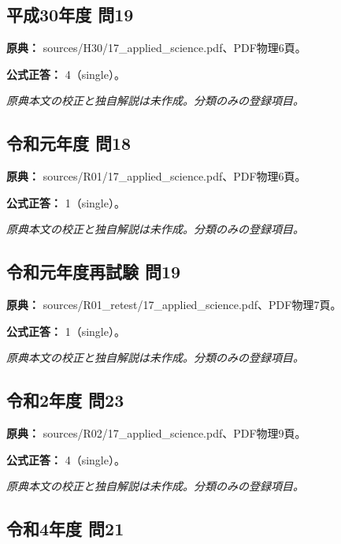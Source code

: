 \subsection{平成30年度 問19}
\label{q:h30-reg-applied-19}

\noindent\textbf{原典：} sources/H30/17\_applied\_science.pdf、PDF物理6頁。

\textbf{公式正答：} 4（single）。

\par\textit{原典本文の校正と独自解説は未作成。分類のみの登録項目。}

\subsection{令和元年度 問18}
\label{q:r01-reg-applied-18}

\noindent\textbf{原典：} sources/R01/17\_applied\_science.pdf、PDF物理6頁。

\textbf{公式正答：} 1（single）。

\par\textit{原典本文の校正と独自解説は未作成。分類のみの登録項目。}

\subsection{令和元年度再試験 問19}
\label{q:r01-ret-applied-19}

\noindent\textbf{原典：} sources/R01\_retest/17\_applied\_science.pdf、PDF物理7頁。

\textbf{公式正答：} 1（single）。

\par\textit{原典本文の校正と独自解説は未作成。分類のみの登録項目。}

\subsection{令和2年度 問23}
\label{q:r02-reg-applied-23}

\noindent\textbf{原典：} sources/R02/17\_applied\_science.pdf、PDF物理9頁。

\textbf{公式正答：} 4（single）。

\par\textit{原典本文の校正と独自解説は未作成。分類のみの登録項目。}

\subsection{令和4年度 問21}
\label{q:r04-reg-applied-21}

